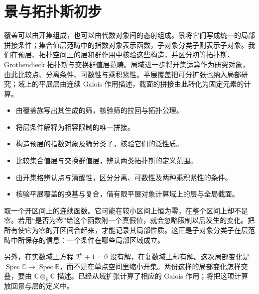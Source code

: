 
\chapter{景与拓扑斯初步}
\label{b4:app:E}

\begin{chapterabstract}
	覆盖可以由开集组成，也可以由代数对象间的态射组成。景将它们写成统一的局部拼接条件；集合值层范畴中的指数对象表示函数，子对象分类子则表示子对象。我们在预层、拓扑空间上的层和群作用中核验这些构造，并区分初等拓扑斯、Grothendieck 拓扑斯与交换群值层范畴。局域进一步将开集运算作为研究对象，由此比较点、分离条件、可数性与乘积紧性。平展覆盖把可分扩张也纳入局部研究；域上的平展层由连续 Galois 作用描述，截面的拼接由此转化为固定元素的计算。
\end{chapterabstract}

\begin{learninggoals}
	\begin{itemize}
		\item 由覆盖族写出其生成的筛，核验筛的拉回与拓扑公理。
		\item 将层条件解释为相容限制的唯一拼接。
		\item 构造预层的指数对象及筛分类子，核验它们的泛性质。
		\item 比较集合值层与交换群值层，辨认两类拓扑斯的定义范围。
		\item 由开集格辨认点与清醒性，区分分离、可数性及两种乘积紧性的条件。
		\item 核验平展覆盖的换基与复合，借有限平展对象计算域上的层与全局截面。
	\end{itemize}
\end{learninggoals}

取一个开区间上的连续函数。它可能在较小区间上恒为零，在整个区间上却不是零。若用“是否为零”给这个函数附一个真假值，就会忽略限制以后发生的变化。把所有使它为零的开区间合起来，才能记录其局部性质。这正是子对象分类子在层范畴中所保存的信息：一个条件在哪些局部区域成立。

\ProseParagraphBreak
另外，在实数域上方程 \(T^2+1=0\) 没有解，在复数域上却有解。这次局部变化是 \(\operatorname{Spec}\mathbb C\to\operatorname{Spec}\mathbb R\)，而不是在单点空间里缩小开集。两份这样的局部变化怎样交叠，要由 \(\mathbb C\otimes_{\mathbb R}\mathbb C\) 描述。已经从域扩张计算了相应的 Galois 作用；将把这项计算放回景与层的定义中。

